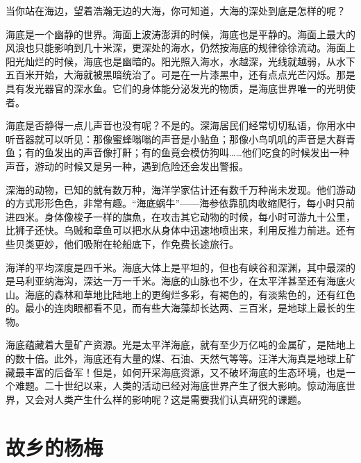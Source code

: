\documentclass[12pt,UTF-8,openany]{ctexbook}
\begin{document}
\begin{large}
    
    当你站在海边，望着浩瀚无边的大海，你可知道，大海的深处到底是怎样的呢？
    
    海底是一个幽静的世界。海面上波涛澎湃的时候，海底也是平静的。海面上最大的风浪也只能影响到几十米深，更深处的海水，仍然按海底的规律徐徐流动。海面上阳光灿烂的时候，海底也是幽暗的。阳光照入海水，水越深，光线就越弱，从水下五百米开始，大海就被黑暗统治了。可是在一片漆黑中，还有点点光芒闪烁。那是具有发光器官的深水鱼。它们的身体能分泌发光的物质，是海底世界唯一的光明使者。
    
    海底是否静得一点儿声音也没有呢？不是的。深海居民们经常切切私语，你用水中听音器就可以听见：那像蜜蜂嗡嗡的声音是小鲇鱼；那像小鸟叽叽的声音是大群青鱼；有的鱼发出的声音像打鼾；有的鱼竟会模仿狗叫……他们吃食的时候发出一种声音，游动的时候又是另一种，遇到危险还会发出警报。
    
    深海的动物，已知的就有数万种，海洋学家估计还有数千万种尚未发现。他们游动的方式形形色色，非常有趣。“海底蜗牛”——海参依靠肌肉收缩爬行，每小时只前进四米。身体像梭子一样的旗魚，在攻击其它动物的时候，每小时可游九十公里，比狮子还快。乌贼和章鱼可以把水从身体中迅速地喷出来，利用反推力前进。还有些贝类更妙，他们吸附在轮船底下，作免费长途旅行。
    
    海洋的平均深度是四千米。海底大体上是平坦的，但也有峡谷和深渊，其中最深的是马利亚纳海沟，深达一万一千米。海底的山脉也不少，在太平洋甚至还有海底火山。海底的森林和草地比陆地上的更绚烂多彩，有褐色的，有淡紫色的，还有红色的。最小的连肉眼都看不见，而有些大海藻却长达两、三百米，是地球上最长的生物。
    
    海底蕴藏着大量矿产资源。光是太平洋海底，就有至少万亿吨的金属矿，是陆地上的数十倍。此外，海底还有大量的煤、石油、天然气等等。汪洋大海真是地球上矿藏最丰富的后备军！但是，如何开采海底资源，又不破坏海底的生态环境，也是一个难题。二十世纪以来，人类的活动已经对海底世界产生了很大影响。惊动海底世界，又会对人类产生什么样的影响呢？这是需要我们认真研究的课题。
    
\end{large}



\chapter{故乡的杨梅}
\end{document}
